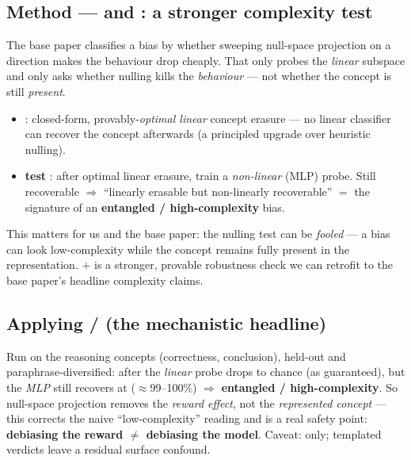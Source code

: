 \documentclass{article}
\begin{document}
\subsection{Method --- \leace{} and \taco{}: a stronger complexity test}
The base paper classifies a bias by whether sweeping null-space projection on a \diffmean{} direction makes
the behaviour drop cheaply. That only probes the \emph{linear} subspace and only asks whether nulling kills
the \emph{behaviour} --- not whether the concept is still \emph{present}.
\begin{itemize}
  \item \textbf{\leace{}} \citep{belrose2023leace}: closed-form, provably-\emph{optimal linear} concept
        erasure --- no linear classifier can recover the concept afterwards (a principled upgrade over
        heuristic \diffmean{} nulling).
  \item \textbf{\taco{} test} \citep{taco2024}: after optimal linear erasure, train a \emph{non-linear} (MLP)
        probe. Still recoverable $\Rightarrow$ ``linearly erasable but non-linearly recoverable'' $=$ the
        signature of an \textbf{entangled / high-complexity} bias.
\end{itemize}
This matters for us and the base paper: the nulling test can be \emph{fooled} --- a bias can look
low-complexity while the concept remains fully present in the representation. \leace{}$+$\taco{} is a
stronger, provable robustness check we can retrofit to the base paper's headline complexity claims.

\subsection{Applying \leace{}/\taco{} (the mechanistic headline)}
Run on the reasoning concepts (correctness, conclusion), held-out and paraphrase-diversified: after \leace{}
the \emph{linear} probe drops to chance (as guaranteed), but the \emph{MLP} still recovers at
\erasureMlpLeaceCorrPL{} ($\approx$99--100\%) $\Rightarrow$ \textbf{entangled / high-complexity}. So
null-space projection removes the \emph{reward effect}, not the \emph{represented concept} --- this corrects
the naive ``low-complexity'' reading and is a real safety point: \textbf{debiasing the reward $\neq$
debiasing the model}. Caveat: \modelSmall{} only; templated verdicts leave a residual surface confound.
\end{document}
